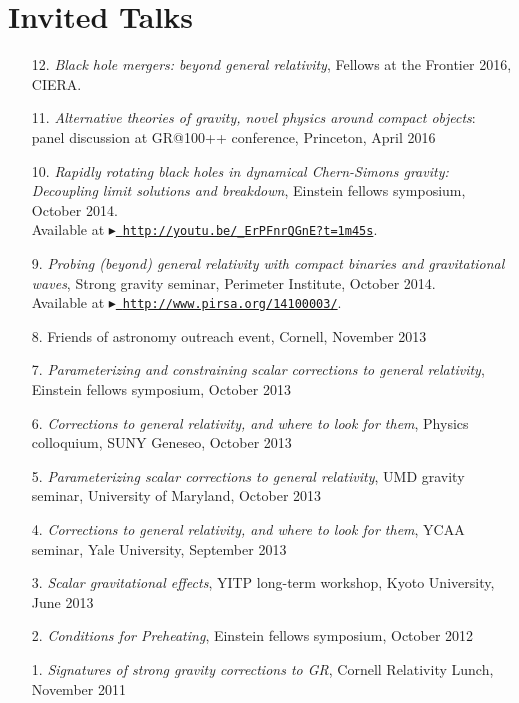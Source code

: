 \newcommand{\playsymbol}{$\blacktriangleright$}
\section{\sc Invited Talks}
\begin{enumerate}
\item[{12.}] {\it Black hole mergers: beyond general relativity},
  Fellows at the Frontier 2016, CIERA.
\item[{11.}] {\it Alternative theories of gravity, novel physics
    around compact objects}: panel discussion at GR@100++ conference,
  Princeton, April 2016
\item[{10.}] {\it Rapidly rotating black holes in dynamical Chern-Simons gravity:
    Decoupling limit solutions and breakdown},
 Einstein fellows symposium, October 2014.\\
 Available at \href{http://youtu.be/_ErPFnrQGnE?t=1m45s}{\playsymbol~\texttt{http://youtu.be/\_ErPFnrQGnE?t=1m45s}}.
\item[{9.}] {\it Probing (beyond) general relativity with compact binaries and
    gravitational waves},
  Strong gravity seminar, Perimeter Institute, October 2014.\\
  Available at \href{http://www.pirsa.org/14100003/}{\playsymbol~\texttt{http://www.pirsa.org/14100003/}}.
\item[{8.}]
  Friends of astronomy outreach event, Cornell, November 2013
\item[{7.}] {\it Parameterizing and constraining scalar corrections to general relativity},
  Einstein fellows symposium, October 2013
\item[{6.}] {\it Corrections to general relativity, and where to look for them},
  Physics colloquium, SUNY Geneseo, October 2013
\item[{5.}] {\it Parameterizing scalar corrections to general relativity}, UMD gravity seminar,
 University of Maryland, October 2013
\item[{4.}] {\it Corrections to general relativity, and where to look for them},
  YCAA seminar, Yale University, September 2013
\item[{3.}] {\it Scalar gravitational effects}, YITP long-term
  workshop, Kyoto University, June 2013
\item[{2.}] {\it Conditions for Preheating},
  Einstein fellows symposium, October 2012
\item[{1.}] {\it Signatures of strong gravity corrections to GR},
  Cornell Relativity Lunch, November 2011
\end{enumerate}

